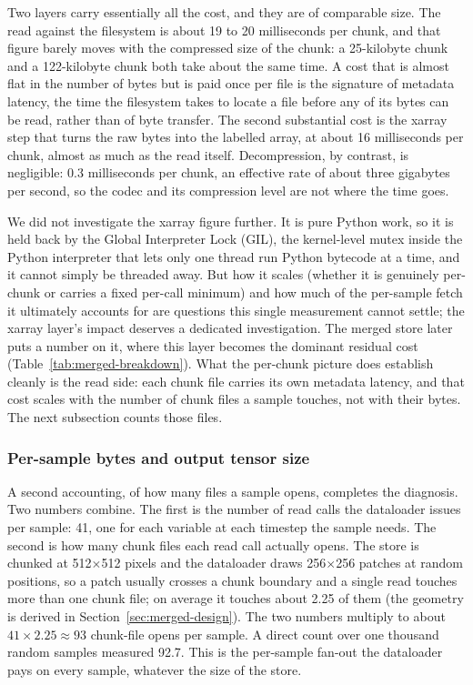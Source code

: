 \documentclass[12pt,a4paper]{article}
\begin{document}
Two layers carry essentially all the cost, and they are of comparable size. The read against
the filesystem is about 19 to 20 milliseconds per chunk, and that figure barely moves with
the compressed size of the chunk: a 25-kilobyte chunk and a 122-kilobyte chunk both take
about the same time. A cost that is almost flat in the number of bytes but is paid once per
file is the signature of metadata latency, the time the filesystem takes to
locate a file before any of its bytes can be read, rather than of byte transfer. The second
substantial cost is the xarray step that turns the raw bytes into the labelled array, at
about 16 milliseconds per chunk, almost as much as the read itself. Decompression, by
contrast, is negligible: 0.3 milliseconds per chunk, an effective rate of about three
gigabytes per second, so the codec and its compression level are not where the time goes.

We did not investigate the xarray figure further. It is pure Python work, so it is held back by
the Global Interpreter Lock (GIL), the kernel-level mutex inside the Python interpreter that
lets only one thread run Python bytecode at a time, and it cannot simply be threaded away.
But how it scales (whether it is genuinely per-chunk or carries a fixed per-call minimum) and
how much of the per-sample fetch it ultimately accounts for are questions this single
measurement cannot settle; the xarray layer's impact deserves a dedicated investigation. The
merged store later puts a number on it, where this layer becomes the dominant residual cost
(Table~\ref{tab:merged-breakdown}). What the per-chunk picture does establish cleanly is the
read side: each chunk file carries its own metadata latency, and that cost scales with the
number of chunk files a sample touches, not with their bytes. The next subsection counts
those files.

\subsubsection{Per-sample bytes and output tensor size}

A second accounting, of how many files a sample opens, completes the diagnosis. Two numbers
combine. The first is the number of read calls the dataloader issues per sample: 41, one for
each variable at each timestep the sample needs. The second is how many chunk files each read
call actually opens. The store is chunked at 512$\times$512 pixels and the dataloader draws
256$\times$256 patches at random positions, so a patch usually crosses a chunk boundary and
a single read touches more than one chunk file; on average it touches about 2.25 of them (the
geometry is derived in Section~\ref{sec:merged-design}). The two numbers multiply to about
$41 \times 2.25 \approx 93$ chunk-file opens per sample. A direct count over one thousand
random samples measured 92.7. This is the per-sample fan-out the dataloader pays on every
sample, whatever the size of the store.
\end{document}
